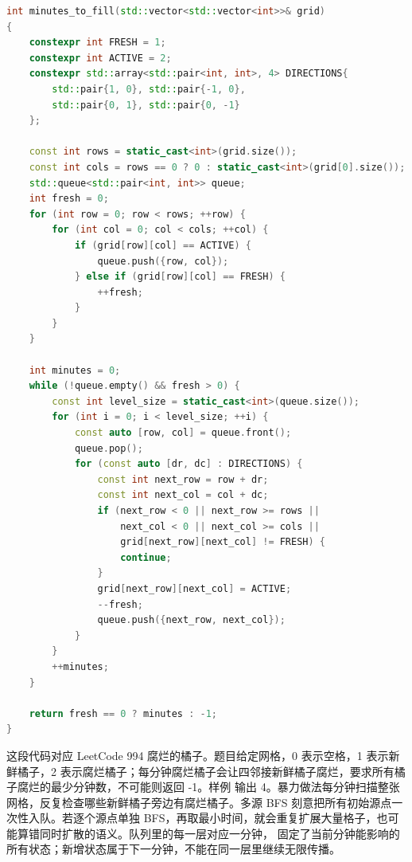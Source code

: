 \begin{lstlisting}[language=C++,caption={LeetCode 994 腐烂的橘子：所有源点同时进入第 0 层}]
int minutes_to_fill(std::vector<std::vector<int>>& grid)
{
    constexpr int FRESH = 1;
    constexpr int ACTIVE = 2;
    constexpr std::array<std::pair<int, int>, 4> DIRECTIONS{
        std::pair{1, 0}, std::pair{-1, 0},
        std::pair{0, 1}, std::pair{0, -1}
    };

    const int rows = static_cast<int>(grid.size());
    const int cols = rows == 0 ? 0 : static_cast<int>(grid[0].size());
    std::queue<std::pair<int, int>> queue;
    int fresh = 0;
    for (int row = 0; row < rows; ++row) {
        for (int col = 0; col < cols; ++col) {
            if (grid[row][col] == ACTIVE) {
                queue.push({row, col});
            } else if (grid[row][col] == FRESH) {
                ++fresh;
            }
        }
    }

    int minutes = 0;
    while (!queue.empty() && fresh > 0) {
        const int level_size = static_cast<int>(queue.size());
        for (int i = 0; i < level_size; ++i) {
            const auto [row, col] = queue.front();
            queue.pop();
            for (const auto [dr, dc] : DIRECTIONS) {
                const int next_row = row + dr;
                const int next_col = col + dc;
                if (next_row < 0 || next_row >= rows ||
                    next_col < 0 || next_col >= cols ||
                    grid[next_row][next_col] != FRESH) {
                    continue;
                }
                grid[next_row][next_col] = ACTIVE;
                --fresh;
                queue.push({next_row, next_col});
            }
        }
        ++minutes;
    }

    return fresh == 0 ? minutes : -1;
}
\end{lstlisting}

这段代码对应 LeetCode 994 腐烂的橘子。题目给定网格，0 表示空格，1 表示新鲜橘子，2 表示腐烂橘子；每分钟腐烂橘子会让四邻接新鲜橘子腐烂，要求所有橘子腐烂的最少分钟数，不可能则返回 -1。样例 \code{[[2,1,1],[1,1,0],[0,1,1]]} 输出 4。暴力做法每分钟扫描整张网格，反复检查哪些新鲜橘子旁边有腐烂橘子。多源 BFS 刻意把所有初始源点一次性入队。若逐个源点单独 BFS，再取最小时间，就会重复扩展大量格子，也可能算错同时扩散的语义。队列里的每一层对应一分钟， 固定了当前分钟能影响的所有状态；新增状态属于下一分钟，不能在同一层里继续无限传播。

